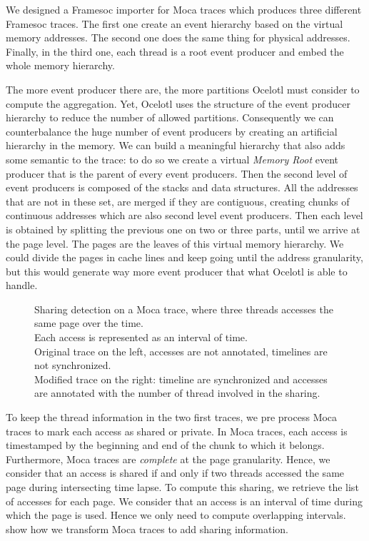 We designed a \gls{Framesoc} importer for \gls{Moca} traces which produces three different \gls{Framesoc} traces.
The first one create an event hierarchy based on the virtual memory addresses.
The second one does the same thing for physical addresses.
Finally, in the third one, each thread is a root event producer and embed the whole memory hierarchy.

The more event producer there are, the more partitions \gls{Ocelotl} must consider to compute the aggregation.
Yet, \gls{Ocelotl} uses the structure of the event producer hierarchy to reduce the number of allowed partitions.
Consequently we can counterbalance the huge number of event producers by creating an artificial hierarchy in the memory.
We can build a meaningful hierarchy that also adds some semantic to the trace: to do so we create a virtual \emph{Memory Root} event producer that is the parent of every event producers.
Then the second level of event producers is composed of the stacks and data structures.
All the addresses that are not in these set, are merged if they are contiguous, creating chunks of continuous addresses which are also second level event producers.
Then each level is obtained by splitting the previous one on two or three parts, until we arrive at the page level.
The pages are the leaves of this virtual memory hierarchy.
We could divide the pages in cache lines and keep going until the address granularity, but this would generate way more event producer that what \gls{Ocelotl} is able to handle.

\begin{figure}[htb]
    \centering
    
    \caption[Sharing detection on Moca traces.]{
        Sharing detection on a Moca trace, where three threads accesses the same page over the time.\\
        Each access is represented as an interval of time.\\
        Original trace on the left, accesses are not annotated, timelines are not synchronized.\\
        Modified trace on the right: timeline are synchronized and accesses are annotated with the number of thread involved in the sharing.
    }
    \label{fig:sharing-detection}
\end{figure}

To keep the thread information in the two first traces, we pre process \gls{Moca} traces to mark each access as shared or private.
In \gls{Moca} traces, each access is timestamped by the beginning and end of the chunk to which it belongs.
Furthermore, \gls{Moca} traces are \emph{complete} at the page granularity.
Hence, we consider that an access is shared if and only if two threads accessed the same page during intersecting time lapse.
To compute this sharing, we retrieve the list of accesses for each page.
We consider that an access is an interval of time during which the page is used.
Hence we only need to compute overlapping intervals.
 show how we transform \gls{Moca} traces to add sharing information.

